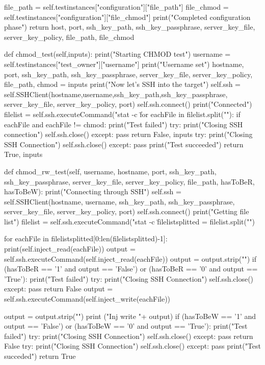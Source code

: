 \begin{python}
		file_path = self.testinstances["configuration"]["file_path"]
		file_chmod = self.testinstances["configuration"]["file_chmod"]
		print("Completed configuration phase")
		return host, port, ssh_key_path, ssh_key_passphrase, server_key_file, server_key_policy, file_path, file_chmod


	def chmod_test(self,inputs):
		print("Starting CHMOD test")
		username = self.testinstances["test_owner"]["username"]
		print("Username set")
		hostname, port, ssh_key_path, ssh_key_passphrase, server_key_file, server_key_policy, file_path, chmod = inputs
		print("Now let's SSH into the target")
		self.ssh = self.SSHClient(hostname,username,ssh_key_path,ssh_key_passphrase, server_key_file, server_key_policy, port)
		self.ssh.connect()
		print("Connected")
		filelist = self.ssh.executeCommand("stat -c \"%
		for eachFile in filelist.split("\n"):
			if eachFile and eachFile != chmod:
				print("Test failed")
				try:
					print("Closing SSH connection")
					self.ssh.close()
				except:
					pass
				return False, inputs
		try:
			print("Closing SSH Connection")
			self.ssh.close()
		except:
			pass
		print("Test succeeded")
		return True, inputs


	def chmod_rw_test(self, username, hostname, port, ssh_key_path, ssh_key_passphrase, server_key_file, server_key_policy, file_path, hasToBeR, hasToBeW):
		print("Connecting through SSH")
		self.ssh = self.SSHClient(hostname, username, ssh_key_path, ssh_key_passphrase, server_key_file, server_key_policy, port)
		self.ssh.connect()
		print("Getting file list")
		filelist = self.ssh.executeCommand("stat  -c \"%
		filelistsplitted = filelist.split("\n")

		for eachFile in filelistsplitted[0:len(filelistsplitted)-1]:
			print(self.inject_read(eachFile))
			output = self.ssh.executeCommand(self.inject_read(eachFile))
			output = output.strip("\n")
			if (hasToBeR == '1' and output == 'False') or (hasToBeR == '0' and output == 'True'):
				print("Test failed")
				try:
					print("Closing SSH Connection")
					self.ssh.close()
				except:
					pass
				return False
			output = self.ssh.executeCommand(self.inject_write(eachFile))

			output = output.strip("\n")
			print ("Inj write "+ output)
			if (hasToBeW == '1' and output == 'False') or (hasToBeW == '0' and output == 'True'):
				print("Test failed")
				try:
					print("Closing SSH Connection")
					self.ssh.close()
				except:
					pass
				return False
		try:
			print("Closing SSH Connection")
			self.ssh.close()
		except:
			pass
		print("Test succeded")
		return True



\end{python}
